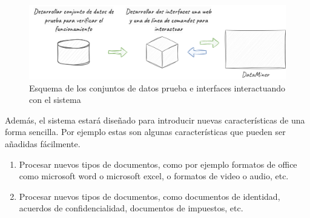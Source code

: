 \begin{figure}[ht]
    \begin{center}
        \includegraphics[width=\textwidth]{chapter/1/images/chapter_1.specific_b}
        \caption{Esquema de los conjuntos de datos prueba e interfaces interactuando con el sistema}
        \label{fig:chapter_1.specific_b}
    \end{center}
\end{figure}

Además, el sistema estará diseñado para introducir nuevas características de una forma sencilla.
Por ejemplo estas son algunas características que pueden ser añadidas fácilmente.

\begin{enumerate}
    \item
    Procesar nuevos tipos de documentos, como por ejemplo formatos de office como microsoft word o microsoft excel,
    o formatos de video o audio, etc.
    \item
    Procesar nuevos tipos de documentos, como documentos de identidad, acuerdos de confidencialidad, documentos
    de impuestos, etc.
\end{enumerate}
